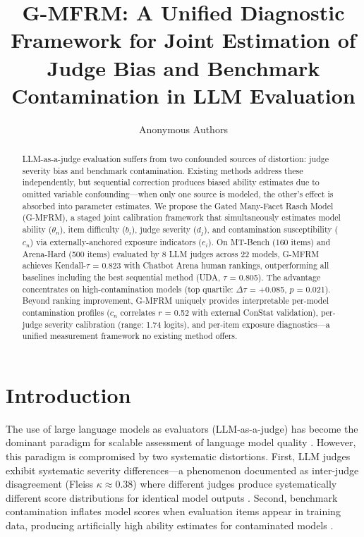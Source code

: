 \documentclass[letterpaper,11pt]{article}
\title{G-MFRM: A Unified Diagnostic Framework for Joint Estimation of Judge Bias and Benchmark Contamination in LLM Evaluation}
\author{
Anonymous Authors
}
\begin{document}
\maketitle

\begin{abstract}
LLM-as-a-judge evaluation suffers from two confounded sources of distortion: judge severity bias and benchmark contamination. Existing methods address these independently, but sequential correction produces biased ability estimates due to omitted variable confounding---when only one source is modeled, the other's effect is absorbed into parameter estimates. We propose the Gated Many-Facet Rasch Model (G-MFRM), a staged joint calibration framework that simultaneously estimates model ability ($\theta_n$), item difficulty ($b_i$), judge severity ($d_j$), and contamination susceptibility ($c_n$) via externally-anchored exposure indicators ($e_i$). On MT-Bench (160 items) and Arena-Hard (500 items) evaluated by 8 LLM judges across 22 models, G-MFRM achieves Kendall-$\tau$ = 0.823 with Chatbot Arena human rankings, outperforming all baselines including the best sequential method (UDA, $\tau$ = 0.805). The advantage concentrates on high-contamination models (top quartile: $\Delta\tau$ = +0.085, $p$ = 0.021). Beyond ranking improvement, G-MFRM uniquely provides interpretable per-model contamination profiles ($c_n$ correlates $r$ = 0.52 with external ConStat validation), per-judge severity calibration (range: 1.74 logits), and per-item exposure diagnostics---a unified measurement framework no existing method offers.
\end{abstract}

\section{Introduction}

The use of large language models as evaluators (LLM-as-a-judge) has become the dominant paradigm for scalable assessment of language model quality \citep{zheng2023judging}. However, this paradigm is compromised by two systematic distortions. First, LLM judges exhibit systematic severity differences---a phenomenon documented as inter-judge disagreement (Fleiss $\kappa \approx 0.38$) where different judges produce systematically different score distributions for identical model outputs \citep{zheng2023judging,li2024cyclicjudge}. Second, benchmark contamination inflates model scores when evaluation items appear in training data, producing artificially high ability estimates for contaminated models \citep{golchin2023time,shi2023detecting}.
\end{document}
